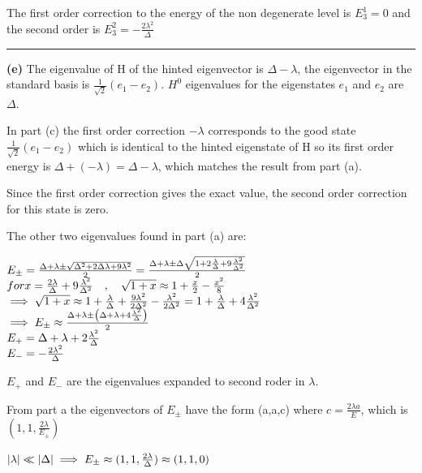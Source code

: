 \documentclass[14pt]{extarticle}
\makeatletter
\newenvironment{lefteqs}{%
    \begin{flushleft}%
    \renewcommand{\arraystretch}{1.3}%
    $\begin{array}{@{}l@{}}%
}{%
    \end{array}$%
    \end{flushleft}%
}
\makeatother
\begin{document}
The first order correction to the energy of the non degenerate level is $E^1_3 = 0$ and the second order is $E^2_3 = -\frac{2\lambda^2}{\Delta}$

\vspace{3em}
\hrule
\vspace{2em}

\textbf{(e)}
The eigenvalue of H of the hinted eigenvector is $\Delta - \lambda$, the eigenvector in the standard basis is $\frac{1}{\sqrt{2}}(e_1 - e_2)$.
$H^0$ eigenvalues for the eigenstates $e_1$ and $e_2$ are $\Delta$.

In part (c) the first order correction $-\lambda$ corresponds to the good state $\frac{1}{\sqrt{2}}(e_1 - e_2)$
which is identical to the hinted eigenstate of H so its first order energy is $\Delta + (-\lambda) = \Delta - \lambda$,
which matches the result from part (a).

Since the first order correction gives the exact value, the second order correction for this state is zero.

The other two eigenvalues found in part (a) are:
\begin{lefteqs}
    E_{\pm} = \frac{\Delta + \lambda \pm \sqrt{\Delta^2 + 2\Delta \lambda + 9\lambda^2}}{2}
    = \frac{\Delta + \lambda \pm \Delta \sqrt{1 + 2\frac{\lambda}{\Delta} + 9 \frac{\lambda^2}{\Delta^2}}}{2} \\
    {for } x=\frac{2\lambda}{\Delta} + 9 \frac{\lambda^2}{\Delta^2}
    \quad , \quad \sqrt{1+x} \approx 1 + \frac{x}{2} - \frac{x^2}{8} \\
    \implies {\sqrt{1+x}} \approx 1 + \frac{\lambda}{\Delta} + \frac{9 \lambda^2}{2 \Delta^2} - \frac{\lambda^2}{2\Delta^2} = 1 + \frac{\lambda}{\Delta} + 4 \frac{\lambda^2}{\Delta^2} \\
    \implies E_{\pm} \approx \frac{\Delta + \lambda \pm \left( \Delta + \lambda + 4 \frac{\lambda^2}{\Delta} \right)}{2} \\
    E_+ = \Delta + \lambda + 2 \frac{\lambda^2}{\Delta} \\
    E_- = - \frac{2\lambda^2}{\Delta}
\end{lefteqs}

$E_+$ and $E_-$ are the eigenvalues expanded to second roder in $\lambda$.

From part a the eigenvectors of $E_\pm$ have the form (a,a,c) where $c=\frac{2\lambda a}{E}$, which is $(1,1,\frac{2\lambda}{E_\pm})$

\begin{lefteqs}
    |\lambda| \ll |\Delta| \implies E_\pm \approx (1,1,\frac{2\lambda}{\Delta}) \approx (1,1,0)
\end{lefteqs}
\end{document}
